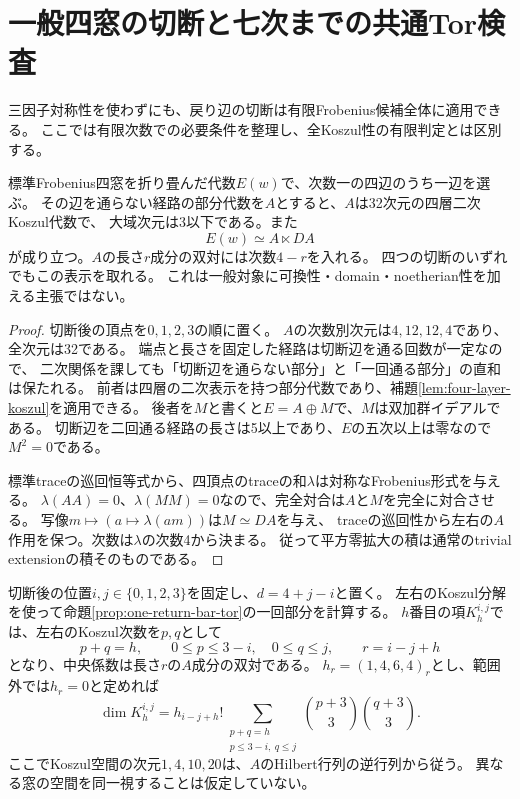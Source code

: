 \section{一般四窓の切断と七次までの共通Tor検査}
\label{sec:general-cut-trivial-extension}
三因子対称性を使わずにも、戻り辺の切断は有限Frobenius候補全体に適用できる。
ここでは有限次数での必要条件を整理し、全Koszul性の有限判定とは区別する。

\begin{proposition}
\label{prop:general-cut-trivial-extension}
標準Frobenius四窓を折り畳んだ代数$E(w)$で、次数一の四辺のうち一辺を選ぶ。
その辺を通らない経路の部分代数を$A$とすると、$A$は32次元の四層二次Koszul代数で、
大域次元は3以下である。また
\[
 E(w)\simeq A\ltimes DA
\]
が成り立つ。$A$の長さ$r$成分の双対には次数$4-r$を入れる。
四つの切断のいずれでもこの表示を取れる。
これは一般対象に可換性・domain・noetherian性を加える主張ではない。
\end{proposition}
\begin{proof}
切断後の頂点を$0,1,2,3$の順に置く。
$A$の次数別次元は$4,12,12,4$であり、全次元は32である。
端点と長さを固定した経路は切断辺を通る回数が一定なので、
二次関係を課しても「切断辺を通らない部分」と「一回通る部分」の直和は保たれる。
前者は四層の二次表示を持つ部分代数であり、補題\ref{lem:four-layer-koszul}を適用できる。
後者を$M$と書くと$E=A\oplus M$で、$M$は双加群イデアルである。
切断辺を二回通る経路の長さは5以上であり、$E$の五次以上は零なので$M^2=0$である。

標準traceの巡回恒等式から、四頂点のtraceの和$\lambda$は対称なFrobenius形式を与える。
$\lambda(AA)=0$、$\lambda(MM)=0$なので、完全対合は$A$と$M$を完全に対合させる。
写像$m\mapsto(a\mapsto\lambda(am))$は$M\simeq DA$を与え、
traceの巡回性から左右の$A$作用を保つ。次数は$\lambda$の次数4から決まる。
従って平方零拡大の積は通常のtrivial extensionの積そのものである。
\end{proof}

切断後の位置$i,j\in\{0,1,2,3\}$を固定し、$d=4+j-i$と置く。
左右のKoszul分解を使って命題\ref{prop:one-return-bar-tor}の一回部分を計算する。
$h$番目の項$K_h^{i,j}$では、左右のKoszul次数を$p,q$として
\[
 p+q=h,\qquad 0\leq p\leq3-i,\quad0\leq q\leq j,
 \qquad r=i-j+h
\]
となり、中央係数は長さ$r$の$A$成分の双対である。
$h_r=(1,4,6,4)_r$とし、範囲外では$h_r=0$と定めれば
\[
 \dim K_h^{i,j}
 =h_{i-j+h}\!!\sum_{\substack{p+q=h\\p\leq3-i,\ q\leq j}}
       \binom{p+3}{3}\binom{q+3}{3}.
\]
ここでKoszul空間の次元$1,4,10,20$は、$A$のHilbert行列の逆行列から従う。
異なる窓の空間を同一視することは仮定していない。

